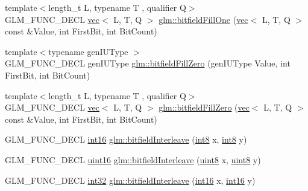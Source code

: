 \begin{DoxyCompactItemize}
\item 
{\footnotesize template$<$length\+\_\+t L, typename T , qualifier Q$>$ }\\G\+L\+M\+\_\+\+F\+U\+N\+C\+\_\+\+D\+E\+CL \hyperlink{structglm_1_1vec}{vec}$<$ L, T, Q $>$ \hyperlink{group__gtc__bitfield_ga3e96dd1f0a4bc892f063251ed118c0c1}{glm\+::bitfield\+Fill\+One} (\hyperlink{structglm_1_1vec}{vec}$<$ L, T, Q $>$ const \&Value, int First\+Bit, int Bit\+Count)
\item 
{\footnotesize template$<$typename gen\+I\+U\+Type $>$ }\\G\+L\+M\+\_\+\+F\+U\+N\+C\+\_\+\+D\+E\+CL gen\+I\+U\+Type \hyperlink{group__gtc__bitfield_ga697b86998b7d74ee0a69d8e9f8819fee}{glm\+::bitfield\+Fill\+Zero} (gen\+I\+U\+Type Value, int First\+Bit, int Bit\+Count)
\item 
{\footnotesize template$<$length\+\_\+t L, typename T , qualifier Q$>$ }\\G\+L\+M\+\_\+\+F\+U\+N\+C\+\_\+\+D\+E\+CL \hyperlink{structglm_1_1vec}{vec}$<$ L, T, Q $>$ \hyperlink{group__gtc__bitfield_ga0d16c9acef4be79ea9b47c082a0cf7c2}{glm\+::bitfield\+Fill\+Zero} (\hyperlink{structglm_1_1vec}{vec}$<$ L, T, Q $>$ const \&Value, int First\+Bit, int Bit\+Count)
\item 
G\+L\+M\+\_\+\+F\+U\+N\+C\+\_\+\+D\+E\+CL \hyperlink{group__gtc__type__precision_ga2945a61d12771f8954994fcddf02b021}{int16} \hyperlink{group__gtc__bitfield_ga479134317bc95d99f2b2e235d3db287b}{glm\+::bitfield\+Interleave} (\hyperlink{group__gtc__type__precision_ga96254f9c1c4506fc8eb5cf3301ce8565}{int8} x, \hyperlink{group__gtc__type__precision_ga96254f9c1c4506fc8eb5cf3301ce8565}{int8} y)
\item 
G\+L\+M\+\_\+\+F\+U\+N\+C\+\_\+\+D\+E\+CL \hyperlink{group__gtc__type__precision_gad8c2939e1fdd8e5828b31d95c52255d5}{uint16} \hyperlink{group__gtc__bitfield_ga0700a3ceb088a0ecc23d76c154096061}{glm\+::bitfield\+Interleave} (\hyperlink{group__gtc__type__precision_ga1a7dcd8aac97cc8020817c94049deff2}{uint8} x, \hyperlink{group__gtc__type__precision_ga1a7dcd8aac97cc8020817c94049deff2}{uint8} y)
\item 
G\+L\+M\+\_\+\+F\+U\+N\+C\+\_\+\+D\+E\+CL \hyperlink{group__gtc__type__precision_ga632d8b25f6b61659f39ea4321fab92a4}{int32} \hyperlink{group__gtc__bitfield_ga1a0264598647ae00a596865af4e1e878}{glm\+::bitfield\+Interleave} (\hyperlink{group__gtc__type__precision_ga2945a61d12771f8954994fcddf02b021}{int16} x, \hyperlink{group__gtc__type__precision_ga2945a61d12771f8954994fcddf02b021}{int16} y)
\item 

\end{DoxyCompactItemize}
